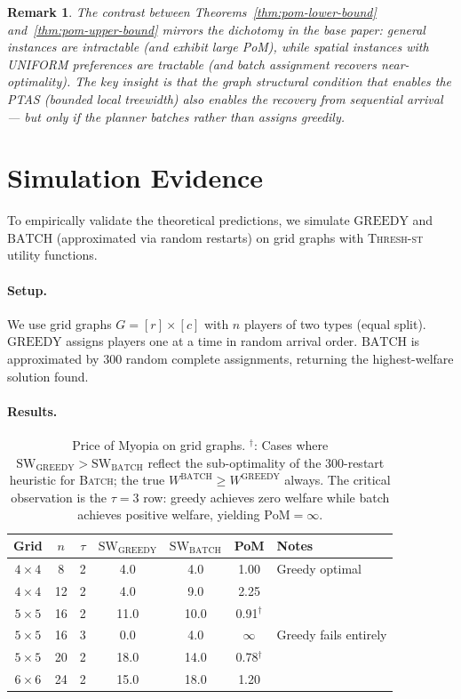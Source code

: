 \documentclass[11pt]{article}
\newtheorem{remark}{Remark}
\newcommand{\SW}{\mathrm{SW}}
\newcommand{\GREEDY}{\mathrm{GREEDY}}
\newcommand{\BATCH}{\mathrm{BATCH}}
\newcommand{\PoM}{\mathrm{PoM}}
\begin{document}
\begin{remark}
  The contrast between Theorems~\ref{thm:pom-lower-bound} and~\ref{thm:pom-upper-bound}
  mirrors the dichotomy in the base paper: general instances are intractable (and
  exhibit large PoM), while spatial instances with UNIFORM preferences are tractable
  (and batch assignment recovers near-optimality).
  The key insight is that the graph structural condition that enables the PTAS
  (bounded local treewidth) also enables the recovery from sequential arrival ---
  but only if the planner batches rather than assigns greedily.
\end{remark}

\section{Simulation Evidence}
\label{sec:simulation}

To empirically validate the theoretical predictions, we simulate $\GREEDY$ and
$\BATCH$ (approximated via random restarts) on grid graphs with
\textsc{Thresh-st} utility functions.

\paragraph{Setup.}
We use grid graphs $G = [r] \times [c]$ with $n$ players of two types (equal split).
$\GREEDY$ assigns players one at a time in random arrival order.
$\BATCH$ is approximated by 300 random complete assignments, returning the
highest-welfare solution found.

\paragraph{Results.}

\begin{table}[h]
\centering
\begin{tabular}{ccccccl}
\hline
Grid & $n$ & $\tau$ & $\SW_{\GREEDY}$ & $\SW_{\BATCH}$ & PoM & Notes \\
\hline
$4 \times 4$ & 8  & 2 & 4.0 & 4.0 & 1.00 & Greedy optimal \\
$4 \times 4$ & 12 & 2 & 4.0 & 9.0 & 2.25 & \\
$5 \times 5$ & 16 & 2 & 11.0 & 10.0 & 0.91${}^\dagger$ & \\
$5 \times 5$ & 16 & 3 & 0.0 & 4.0 & $\infty$ & Greedy fails entirely \\
$5 \times 5$ & 20 & 2 & 18.0 & 14.0 & 0.78${}^\dagger$ & \\
$6 \times 6$ & 24 & 2 & 15.0 & 18.0 & 1.20 & \\
\hline
\end{tabular}
\caption{Price of Myopia on grid graphs.
  ${}^\dagger$: Cases where $\SW_{\GREEDY} > \SW_{\BATCH}$ reflect the
  sub-optimality of the 300-restart heuristic for \textsc{Batch}; the true
  $W^{\BATCH} \geq W^{\GREEDY}$ always.
  The critical observation is the $\tau = 3$ row: greedy achieves zero welfare
  while batch achieves positive welfare, yielding $\PoM = \infty$.}
\label{tab:simulation}
\end{table}
\end{document}

